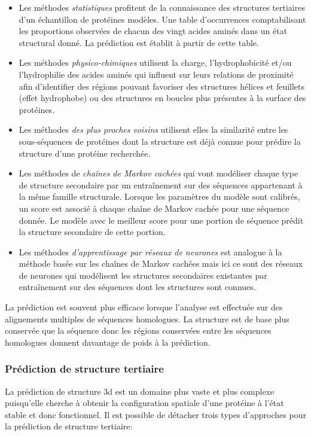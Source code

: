 \begin{itemize}
	\item Les méthodes \textit{statistiques} profitent de la connaissance des structures tertiaires d'un échantillon de protéines modèles. Une table d'occurrences comptabilisant les proportions observées de chacun des vingt acides aminés dans un état structural donné. La prédiction est établit à partir de cette table.
	\item Les méthodes \textit{physico-chimiques} utilisent la charge, l'hydrophobicité et/ou l'hydrophilie des acides aminés qui influent sur leurs relations de proximité afin d'identifier des régions pouvant favoriser des structures hélices et feuillets (effet hydrophobe) ou des structures en boucles plus présentes à la surface des protéines.
	\item Les méthodes \textit{des plus proches voisins} utilisent elles la similarité entre les sous-séquences de protéines dont la structure est déjà connue pour prédire la structure d'une protéine recherchée.
	\item Les méthodes de \textit{chaînes de Markov cachées} qui vont modéliser chaque type de structure secondaire par un entraînement sur des séquences appartenant à la même famille structurale. Lorsque les paramètres du modèle sont calibrés, un score est associé à chaque chaîne de Markov cachée pour une séquence donnée. Le modèle avec le meilleur score pour une portion de séquence prédit la structure secondaire de cette portion.
	\item Les méthodes \textit{d'apprentissage par réseaux de neurones} est analogue à la méthode basée sur les chaînes de Markov cachées mais ici ce sont des réseaux de neurones qui modélisent les structures secondaires existantes par entraînement sur des séquences dont les structures sont connues.
\end{itemize}

La prédiction est souvent plus efficace lorsque l'analyse est effectuée sur des alignements multiples de séquences homologues. La structure est de base plus conservée que la séquence donc les régions conservées entre les séquences homologues donnent davantage de poids à la prédiction.

\subsubsection{Prédiction de structure tertiaire} 

La prédiction de structure 3d est un domaine plus vaste et plus complexe puisqu'elle cherche à obtenir la configuration spatiale d'une protéine à l'état stable et donc fonctionnel. Il est possible de détacher trois types d'approches pour la prédiction de structure tertiaire:

